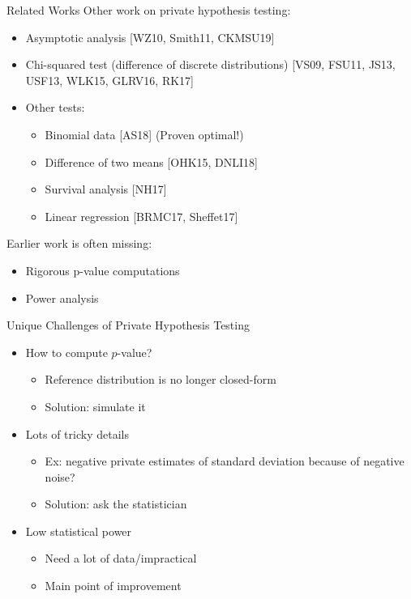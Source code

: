 \documentclass{beamer}
\begin{document}
\begin{frame}{Related Works}
    Other work on private hypothesis testing:\pause
\begin{itemize}
\item Asymptotic analysis [WZ10, Smith11, CKMSU19] \pause
\item Chi-squared test (difference of discrete distributions) [VS09, FSU11, JS13, USF13, WLK15, GLRV16, RK17] \pause
\item Other tests: \pause
\begin{itemize}
\item Binomial data [AS18] (Proven optimal!) \pause
\item Difference of two means [OHK15, DNLI18] \pause
\item Survival analysis [NH17] \pause
\item Linear regression [BRMC17, Sheffet17] \pause
\end{itemize}
\end{itemize}
Earlier work is often missing: \pause
\begin{itemize}
\item Rigorous p-value computations \pause
\item Power analysis
\end{itemize}
\end{frame}

\begin{frame}{Unique Challenges of Private Hypothesis Testing}
\begin{itemize}
    \item How to compute $p$-value? \pause
        \begin{itemize}
            \item Reference distribution is no longer closed-form \pause
            \item Solution: simulate it
        \end{itemize}
    \item Lots of tricky details \pause
        \begin{itemize}
            \item Ex: negative private estimates of standard deviation because of negative noise? \pause
            \item Solution: ask the statistician \pause
        \end{itemize}
    \item Low statistical power \pause
        \begin{itemize}
            \item Need a lot of data/impractical \pause
            \item Main point of improvement
        \end{itemize}
\end{itemize}
\end{frame}
\end{document}
